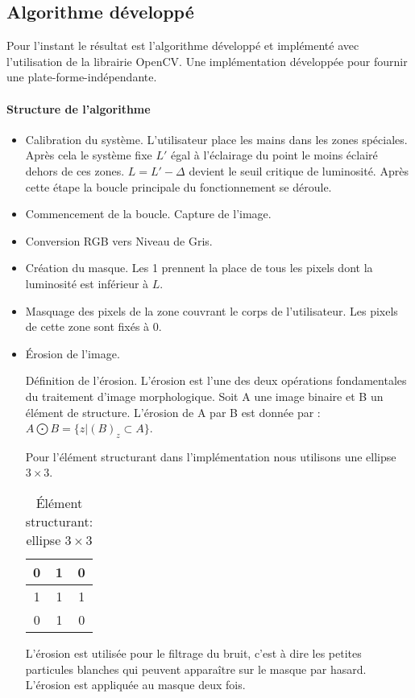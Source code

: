 \subsection*{Algorithme développé}
\par Pour l'instant le résultat est l'algorithme développé et implémenté avec l'utilisation de la librairie OpenCV. Une implémentation développée pour fournir une plate-forme-indépendante.
\paragraph{Structure de l'algorithme}
\begin{itemize}
\item Calibration du système. L'utilisateur place les mains dans les zones spéciales. Après cela le système fixe $L'$ égal à l'éclairage du point le moins éclairé dehors de ces zones. $L=L'-\Delta$ devient le seuil critique de luminosité. Après cette étape la boucle principale du fonctionnement se déroule.
\item Commencement de la boucle. Capture de l'image.
\item Conversion RGB vers Niveau de Gris. 
\item Création du masque. Les 1 prennent la place de tous les pixels dont la luminosité est inférieur à $L$.
\item Masquage des pixels de la zone couvrant le corps de l'utilisateur. Les pixels de cette zone sont fixés à 0.
\item Érosion de l'image. 
\par Définition de l'érosion. L'érosion est l'une des deux opérations fondamentales du traitement d'image morphologique. Soit A une image binaire et B un élément de structure. L'érosion de A par B est donnée par : $A \bigodot B = \{z|(B)_z \subset A\}$.
\par Pour l'élément structurant dans l'implémentation nous utilisons une ellipse $3 \times 3$.
\begin{table}[h]
\centering
\begin{tabular}{|c|c|c|}
\hline
0 & 1 & 0 \\ \hline
1 & 1 & 1 \\ \hline
0 & 1 & 0 \\ \hline
\end{tabular}
\caption{Élément structurant: ellipse $3 \times 3$}
\end{table}
\par L'érosion est utilisée pour le filtrage du bruit, c'est à dire les petites particules blanches qui peuvent apparaître sur le masque par hasard. L'érosion est appliquée au masque deux fois.

\end{itemize}
